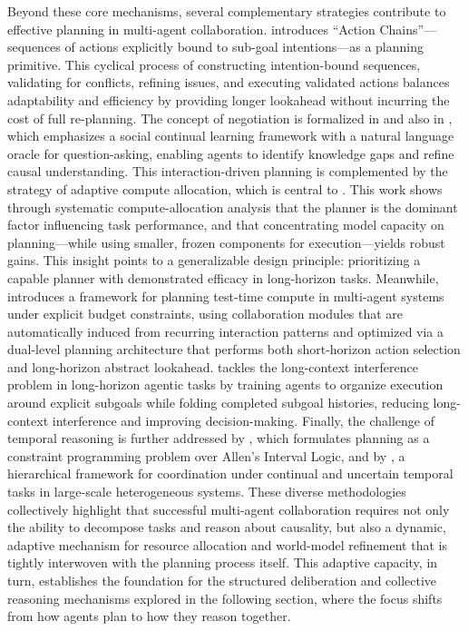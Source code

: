 \documentclass[11pt]{article}
\begin{document}
Beyond these core mechanisms, several complementary strategies contribute to effective planning in multi-agent collaboration. \cite{ref196} introduces ``Action Chains''---sequences of actions explicitly bound to sub-goal intentions---as a planning primitive. This cyclical process of constructing intention-bound sequences, validating for conflicts, refining issues, and executing validated actions balances adaptability and efficiency by providing longer lookahead without incurring the cost of full re-planning. The concept of negotiation is formalized in \cite{ref193} and also in \cite{ref197}, which emphasizes a social continual learning framework with a natural language oracle for question-asking, enabling agents to identify knowledge gaps and refine causal understanding. This interaction-driven planning is complemented by the strategy of adaptive compute allocation, which is central to \cite{ref198}. This work shows through systematic compute-allocation analysis that the planner is the dominant factor influencing task performance, and that concentrating model capacity on planning---while using smaller, frozen components for execution---yields robust gains. This insight points to a generalizable design principle: prioritizing a capable planner with demonstrated efficacy in long-horizon tasks. Meanwhile, \cite{ref199} introduces a framework for planning test-time compute in multi-agent systems under explicit budget constraints, using collaboration modules that are automatically induced from recurring interaction patterns and optimized via a dual-level planning architecture that performs both short-horizon action selection and long-horizon abstract lookahead. \cite{ref200} tackles the long-context interference problem in long-horizon agentic tasks by training agents to organize execution around explicit subgoals while folding completed subgoal histories, reducing long-context interference and improving decision-making. Finally, the challenge of temporal reasoning is further addressed by \cite{ref201}, which formulates planning as a constraint programming problem over Allen's Interval Logic, and by \cite{ref202}, a hierarchical framework for coordination under continual and uncertain temporal tasks in large-scale heterogeneous systems. These diverse methodologies collectively highlight that successful multi-agent collaboration requires not only the ability to decompose tasks and reason about causality, but also a dynamic, adaptive mechanism for resource allocation and world-model refinement that is tightly interwoven with the planning process itself. This adaptive capacity, in turn, establishes the foundation for the structured deliberation and collective reasoning mechanisms explored in the following section, where the focus shifts from how agents plan to how they reason together.
\end{document}
